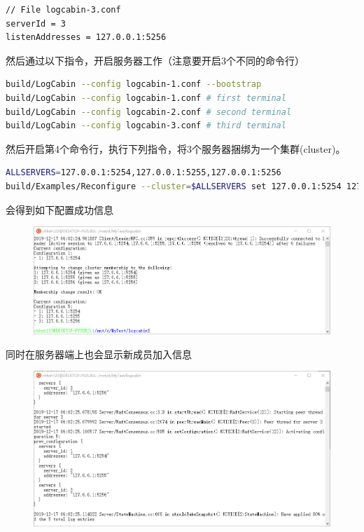 \documentclass[logo,reportComp]{thesis}
\begin{document}
\begin{answer}
\begin{lstlisting}
// File logcabin-3.conf
serverId = 3
listenAddresses = 127.0.0.1:5256
\end{lstlisting}
然后通过以下指令，开启服务器工作（注意要开启3个不同的命令行）
\begin{lstlisting}[language=bash]
build/LogCabin --config logcabin-1.conf --bootstrap
build/LogCabin --config logcabin-1.conf # first terminal
build/LogCabin --config logcabin-2.conf # second terminal
build/LogCabin --config logcabin-3.conf # third terminal
\end{lstlisting}
然后开启第4个命令行，执行下列指令，将3个服务器捆绑为一个集群(cluster)。
\begin{lstlisting}[language=bash]
ALLSERVERS=127.0.0.1:5254,127.0.0.1:5255,127.0.0.1:5256
build/Examples/Reconfigure --cluster=$ALLSERVERS set 127.0.0.1:5254 127.0.0.1:5255 127.0.0.1:5256
\end{lstlisting}
会得到如下配置成功信息
\begin{figure}[H]
\centering
\includegraphics[width=\linewidth]{fig/config.png}
\end{figure}
同时在服务器端上也会显示新成员加入信息
\begin{figure}[H]
\centering
\includegraphics[width=\linewidth]{fig/server.png}
\end{figure}


\end{answer}
\end{document}
